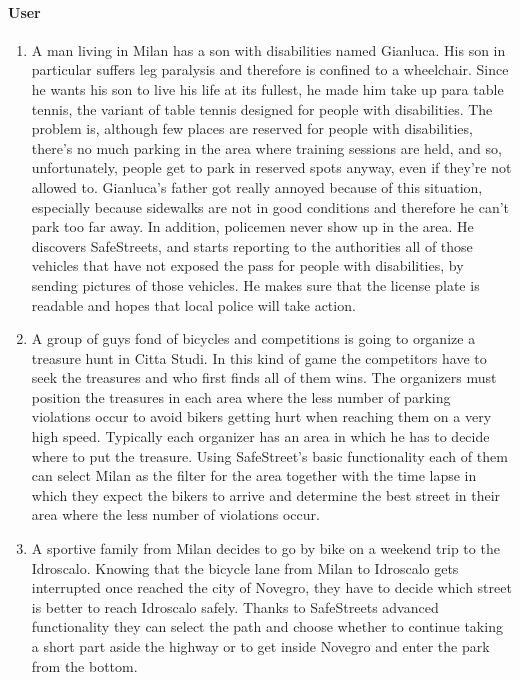 		\paragraph{User}
		\begin{enumerate}[label=\textbf{US\arabic*}]
			\item \label{sce:notification} A man living in Milan has a son with disabilities named Gianluca. His son in particular suffers leg paralysis and therefore is confined to a wheelchair. Since he wants his son to live his life at its fullest, he made him take up para table tennis, the variant of table tennis designed for people with disabilities. The problem is, although few places are reserved for people with disabilities, there’s no much parking in the area where training sessions are held, and so, unfortunately, people get to park in reserved spots anyway, even if they’re not allowed to. Gianluca’s father got really annoyed because of this situation, especially because sidewalks are not in good conditions and therefore he can’t park too far away. In addition, policemen never show up in the area. He discovers SafeStreets, and starts reporting to the authorities all of those vehicles that have not exposed the pass for people with disabilities, by sending pictures of those vehicles. He makes sure that the license plate is readable and hopes that local police will take action.
			
			\item \label{sce:basicUser} A group of guys fond of bicycles and competitions is going to organize a treasure hunt in Citta Studi. In this kind of game the competitors have to seek the treasures and who first finds all of them wins. The organizers must position the treasures in each area where the less number of parking violations occur to avoid bikers getting hurt when reaching them on a very high speed. Typically each organizer has an area in which he has to decide where to put the treasure. Using SafeStreet’s basic functionality each of them can select Milan as the filter for the area together with the time lapse in which they expect the bikers to arrive and determine the best street in their area where the less number of violations occur.
			
			\item \label{sce:advancedUser} A sportive family from Milan decides to go by bike on a weekend trip to the Idroscalo. Knowing that the bicycle lane from Milan to Idroscalo gets interrupted once reached the city of Novegro, they have to decide which street is better to reach Idroscalo safely. Thanks to SafeStreets advanced functionality they can select the path and choose whether to continue taking a short part aside the highway or to get inside Novegro and enter the park from the bottom. 
		\end{enumerate}
	
